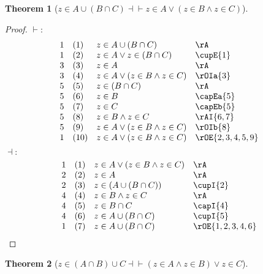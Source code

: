 \documentclass{book}
\theoremstyle{plain}
\newtheorem{theorem}{Theorem}
\theoremstyle{remark}
\theoremstyle{definition}
\begin{document}
\label{zInAcuLpBcaCRpEqvzInAOrLpzInBAndzInCRp}
\begin{theorem}[\(z \in A \cup (B\cap C) \dashv\vdash z \in A \lor (z \in B\land z\in C)\)]
\end{theorem}	
\begin{proof}
	\(\vdash:\)
	\[
	\begin{array}{llll}
		1 & (1) & z \in A \cup (B\cap C) & \rA \\
		1 & (2) & z\in A\lor z\in (B\cap C) & \cupE{1} \\
		3 & (3) & z\in A & \rA \\
		3 & (4) & z\in A\lor (z\in B\land z\in C) & \rOIa{3} \\
		5 & (5) & z\in (B\cap C) & \rA \\
		5 & (6) & z\in B & \capEa{5} \\
		5 & (7) & z\in C & \capEb{5} \\
		5 & (8) & z\in B\land z\in C & \rAI{6,7} \\
		5 & (9) & z\in A\lor (z\in B\land z\in C) & \rOIb{8} \\
		1 & (10) & z\in A\lor (z\in B\land z\in C) & \rOE{2,3,4,5,9} \\
	\end{array}
	\]
	\(\dashv:\)
	\[
	\begin{array}{llll}
		1 & (1) & z\in A\lor (z\in B\land z\in C) & \rA\\			
		2 & (2) & z\in A & \rA\\			
		2 & (3) & z\in (A\cup (B\cap C)) & \cupI{2} \\			
		4 & (4) & z\in B\land z\in C & \rA \\	
		4 & (5) & z\in B\cap C & \capI{4} \\
		4 & (6) & z\in A\cup (B\cap C) & \cupI{5} \\
		1 & (7) & z\in A\cup (B\cap C) & \rOE{1,2,3,4,6} \\
	\end{array}
	\]
\end{proof}

\label{zInLpAcaBRpcuCEqvLpzInAAndzInBRpOrzInC}
\begin{theorem}[\(z \in (A\cap B)\cup C \dashv\vdash (z \in A\land z\in B)\lor z\in C\)]
\end{theorem}	
\end{document}
